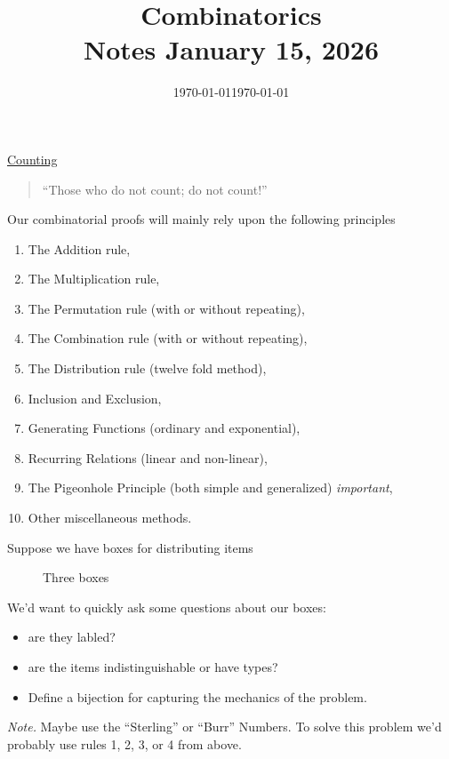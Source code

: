 \documentclass[12pt]{amsart}
\title{Combinatorics\\Notes January 15, 2026}
\date{\today}
\theoremstyle{definition}
\begin{document}
    \maketitle
    \date{\today}
    \begin{onehalfspace}
        \underline{Counting}
        \begin{quote}
            ``Those who do not count; do not count!''
        \end{quote}
        Our combinatorial proofs will mainly rely upon the following principles
        \begin{enumerate}
            \item The Addition rule,
            \item The Multiplication rule,
            \item The Permutation rule (with or without repeating),
            \item The Combination rule (with or without repeating),
            \item The Distribution rule (twelve fold method),
            \item Inclusion and Exclusion,
            \item Generating Functions (ordinary and exponential),
            \item Recurring Relations (linear and non-linear),
            \item The Pigeonhole Principle (both simple and generalized) \emph{important},
            \item Other miscellaneous methods.
        \end{enumerate}
        Suppose we have boxes for distributing items
        \begin{figure}[!ht]
            \centering
            \caption{Three boxes}
        \end{figure}
        We'd want to quickly ask some questions about our boxes:
        \begin{itemize}
            \item are they labled?
            \item are the items indistinguishable or have types?
            \item Define a bijection for capturing the mechanics of the problem.
        \end{itemize}
        \emph{Note.} Maybe use the ``Sterling'' or ``Burr'' Numbers.
        To solve this problem we'd probably use rules 1, 2, 3, or 4 from above.


\end{onehalfspace}
\end{document}
